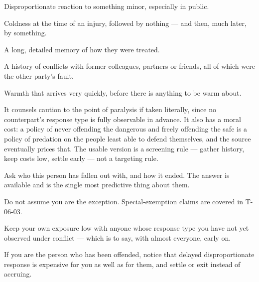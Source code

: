 \begin{feedback}
  \item Disproportionate reaction to something minor, especially in public.
  \item Coldness at the time of an injury, followed by nothing --- and then, much later, by something.
  \item A long, detailed memory of how they were treated.
  \item A history of conflicts with former colleagues, partners or friends, all of which were the other party's fault.
  \item Warmth that arrives very quickly, before there is anything to be warm about.
\end{feedback}

\begin{failure}
It counsels caution to the point of paralysis if taken literally, since no counterpart's response type is fully observable in advance. It also has a moral cost: a policy of never offending the dangerous and freely offending the safe is a policy of predation on the people least able to defend themselves, and the source eventually prices that. The usable version is a screening rule --- gather history, keep costs low, settle early --- not a targeting rule.
\end{failure}

\begin{countermeasures}
  \item Ask who this person has fallen out with, and how it ended. The answer is available and is the single most predictive thing about them.
  \item Do not assume you are the exception. Special-exemption claims are covered in T-06-03.
  \item Keep your own exposure low with anyone whose response type you have not yet observed under conflict --- which is to say, with almost everyone, early on.
  \item If you are the person who has been offended, notice that delayed disproportionate response is expensive for you as well as for them, and settle or exit instead of accruing.
\end{countermeasures}

\seesources
{}
